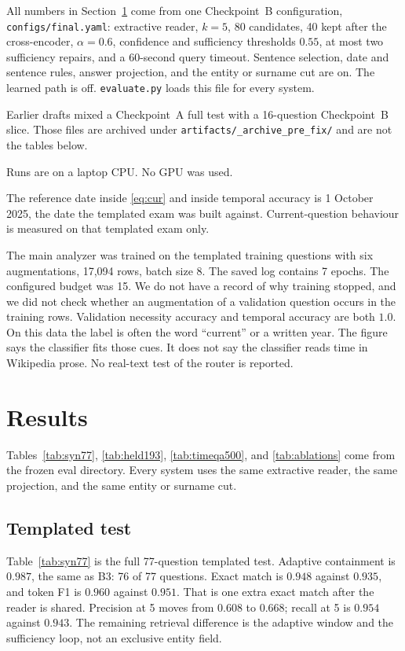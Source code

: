\documentclass[11pt]{article}
\begin{document}
All numbers in Section~\ref{sec:results} come from one Checkpoint~B configuration, \texttt{configs/final.yaml}: extractive reader, $k{=}5$, 80 candidates, 40 kept after the cross-encoder, $\alpha=0.6$, confidence and sufficiency thresholds $0.55$, at most two sufficiency repairs, and a 60-second query timeout.
Sentence selection, date and sentence rules, answer projection, and the entity or surname cut are on.
The learned path is off.
\texttt{evaluate.py} loads this file for every system.

Earlier drafts mixed a Checkpoint~A full test with a 16-question Checkpoint~B slice.
Those files are archived under \texttt{artifacts/\_archive\_pre\_fix/} and are not the tables below.

Runs are on a laptop CPU.
No GPU was used.

The reference date inside \eqref{eq:cur} and inside temporal accuracy is 1 October 2025, the date the templated exam was built against.
Current-question behaviour is measured on that templated exam only.

The main analyzer was trained on the templated training questions with six augmentations, 17{,}094 rows, batch size 8.
The saved log contains 7 epochs.
The configured budget was 15.
We do not have a record of why training stopped, and we did not check whether an augmentation of a validation question occurs in the training rows.
Validation necessity accuracy and temporal accuracy are both $1.0$.
On this data the label is often the word ``current'' or a written year.
The figure says the classifier fits those cues.
It does not say the classifier reads time in Wikipedia prose.
No real-text test of the router is reported.

\section{Results}
\label{sec:results}

Tables~\ref{tab:syn77}, \ref{tab:held193}, \ref{tab:timeqa500}, and \ref{tab:ablations} come from the frozen eval directory.
Every system uses the same extractive reader, the same projection, and the same entity or surname cut.



\subsection{Templated test}

Table~\ref{tab:syn77} is the full 77-question templated test.
Adaptive containment is $0.987$, the same as B3: 76 of 77 questions.
Exact match is $0.948$ against $0.935$, and token F1 is $0.960$ against $0.951$.
That is one extra exact match after the reader is shared.
Precision at 5 moves from $0.608$ to $0.668$; recall at 5 is $0.954$ against $0.943$.
The remaining retrieval difference is the adaptive window and the sufficiency loop, not an exclusive entity field.
\end{document}
